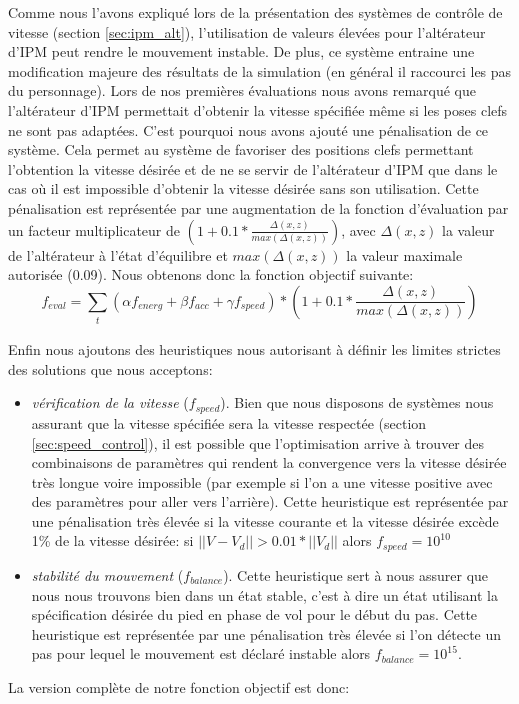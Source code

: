 \documentclass[runningheads,a4paper]{llncs}
\begin{document}
Comme nous l'avons expliqué lors de la présentation des systèmes de contrôle de vitesse (section \ref{sec:ipm_alt}), l'utilisation de valeurs élevées pour l'altérateur d'IPM peut rendre le mouvement instable. De plus, ce système entraine une modification majeure des résultats de la simulation (en général il raccourci les pas du personnage). Lors de nos premières évaluations nous avons remarqué que l'altérateur d'IPM permettait d'obtenir la vitesse spécifiée même si les poses clefs ne sont pas adaptées. C'est pourquoi nous avons ajouté une pénalisation de ce système. Cela permet au système de favoriser des positions clefs permettant l'obtention la vitesse désirée et de ne se servir de l'altérateur d'IPM que dans le cas où il est impossible d'obtenir la vitesse désirée sans son utilisation. Cette pénalisation est représentée par une augmentation de la fonction d'évaluation par un facteur multiplicateur de $(1+0.1*\frac{\Delta(x,z)}{max(\Delta(x,z))})$, avec $\Delta(x,z)$ la valeur de l'altérateur à l'état d'équilibre et $max(\Delta(x,z))$ la valeur maximale autorisée (0.09). Nous obtenons donc la fonction objectif suivante:
$$
f_{eval} = \sum_{\substack{t}} (\alpha f_{energ} + \beta f_{acc} + \gamma f_{speed})*(1+0.1*\frac{\Delta(x,z)}{max(\Delta(x,z))}) 
$$

Enfin nous ajoutons des heuristiques nous autorisant à définir les limites strictes des solutions que nous acceptons:
\begin{itemize}
\item{\textit{vérification de la vitesse} ($f_{speed}$). Bien que nous disposons de systèmes nous assurant que la vitesse spécifiée sera la vitesse respectée (section \ref{sec:speed_control}), il est possible que l'optimisation arrive à trouver des combinaisons de paramètres qui rendent la convergence vers la vitesse désirée très longue voire impossible (par exemple si l'on a une vitesse positive avec des paramètres pour aller vers l'arrière). Cette heuristique est représentée par une pénalisation très élevée si la vitesse courante et la vitesse désirée excède 1\% de la vitesse désirée: si $||V-V_d||>0.01*||V_d||$ alors $f_{speed}=10^{10}$}
\item{\textit{stabilité du mouvement} ($f_{balance}$).  Cette heuristique sert à nous assurer que nous nous trouvons bien dans un état stable, c'est à dire un état utilisant la spécification désirée du pied en phase de vol pour le début du pas. Cette heuristique est représentée par une pénalisation très élevée si l'on détecte un pas pour lequel le mouvement est déclaré instable alors $f_{balance}=10^{15}$.  }
\end{itemize}
 La version complète de notre fonction objectif est donc:
\end{document}

